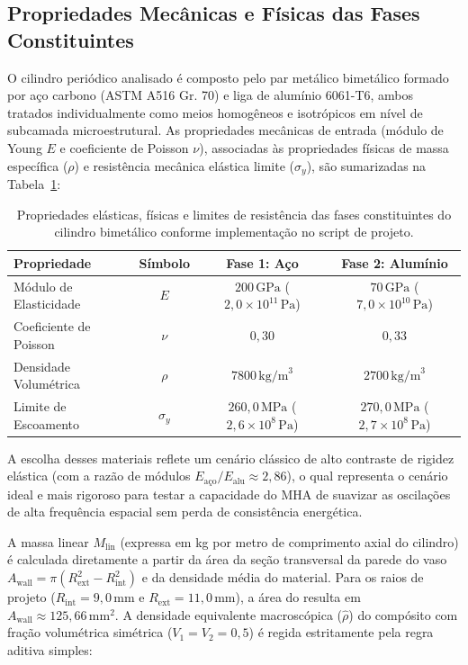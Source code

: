 \subsection{Propriedades Mecânicas e Físicas das Fases Constituintes}

O cilindro periódico analisado é composto pelo par metálico bimetálico formado por aço carbono (ASTM A516 Gr. 70) e liga de alumínio 6061-T6, ambos tratados individualmente como meios homogêneos e isotrópicos em nível de subcamada microestrutural. As propriedades mecânicas de entrada (módulo de Young $E$ e coeficiente de Poisson $\nu$), associadas às propriedades físicas de massa específica ($\rho$) e resistência mecânica elástica limite ($\sigma_y$), são sumarizadas na Tabela~\ref{tab:propriedades_fases}:

\begin{table}[htbp]
  \centering
  \caption{Propriedades elásticas, físicas e limites de resistência das fases constituintes do cilindro bimetálico conforme implementação no script de projeto.}
  \label{tab:propriedades_fases}
  \begin{tabular}{l c c c}
    \hline
    \textbf{Propriedade} & \textbf{Símbolo} & \textbf{Fase 1: Aço} & \textbf{Fase 2: Alumínio} \\ \hline
    Módulo de Elasticidade & $E$ & $200 \, \text{GPa}$ ($2,0 \times 10^{11} \, \text{Pa}$) & $70 \, \text{GPa}$ ($7,0 \times 10^{10} \, \text{Pa}$) \\ \hline
    Coeficiente de Poisson & $\nu$ & $0,30$ & $0,33$ \\ \hline
    Densidade Volumétrica & $\rho$ & $7800 \, \text{kg/m}^3$ & $2700 \, \text{kg/m}^3$ \\ \hline
    Limite de Escoamento & $\sigma_y$ & $260,0 \, \text{MPa}$ ($2,6 \times 10^8 \, \text{Pa}$) & $270,0 \, \text{MPa}$ ($2,7 \times 10^8 \, \text{Pa}$) \\ \hline
  \end{tabular}
\end{table}

A escolha desses materiais reflete um cenário clássico de alto contraste de rigidez elástica (com a razão de módulos $E_{\text{aço}}/E_{\text{alu}} \approx 2,86$), o qual representa o cenário ideal e mais rigoroso para testar a capacidade do MHA de suavizar as oscilações de alta frequência espacial sem perda de consistência energética.

A massa linear $M_{\text{lin}}$ (expressa em kg por metro de comprimento axial do cilindro) é calculada diretamente a partir da área da seção transversal da parede do vaso $A_{\text{wall}} = \pi (R_{\text{ext}}^2 - R_{\text{int}}^2)$ e da densidade média do material. Para os raios de projeto ($R_{\text{int}} = 9,0 \, \text{mm}$ e $R_{\text{ext}} = 11,0 \, \text{mm}$), a área do resulta em $A_{\text{wall}} \approx 125,66 \, \text{mm}^2$. A densidade equivalente macroscópica ($\hat{\rho}$) do compósito com fração volumétrica simétrica ($V_1 = V_2 = 0,5$) é regida estritamente pela regra aditiva simples:

